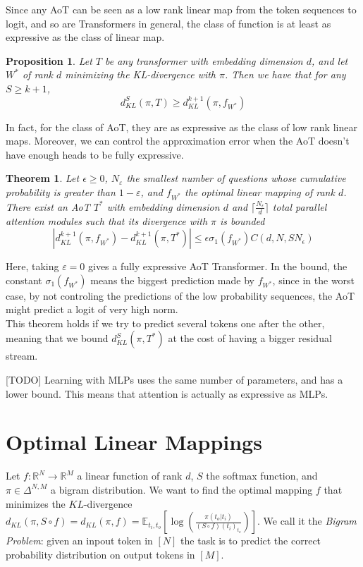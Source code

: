 \documentclass{article}
\newtheorem{theorem}{Theorem}
\newtheorem{prop}{Proposition}
\begin{document}
Since any AoT can be seen as a low rank linear map from the token sequences to logit, and so are Transformers in general, 
the class of function is at least as expressive as the class of linear map.
\bigbreak
\begin{prop}
    Let $T$ be any transformer with embedding dimension $d$, and let $W^*$ of rank $d$ minimizing the KL-divergence with $\pi$.
    Then we have that for any $S\geq k+1$, \[d_{KL}^S(\pi, T) \geq d_{KL}^{k+1}(\pi, f_{W^*}) \]
    \bigbreak
\end{prop}

In fact, for the class of AoT, they are as expressive as the class of low rank linear maps. 
Moreover, we can control the approximation error when the AoT doesn't have enough heads to be fully expressive.
\bigbreak
\begin{theorem}
    Let $\epsilon \geq 0$, $N_{\varepsilon}$ the smallest number of questions whose cumulative probability is greater than 
    $1-\varepsilon$, and $f_{W^*}$ the optimal linear mapping of rank $d$. 
    There exist an AoT $T^*$ with embedding dimension $d$ and $\lceil\frac{N_{\epsilon}}{d}\rceil$ total parallel attention modules 
    such that its divergence with $\pi$ is bounded
    \[\left|d_{KL}^{k+1}(\pi, f_{W^*}) - d_{KL}^{k+1}(\pi, T^*)\right| 
    \leq 
    \epsilon\sigma_1(f_{W^*})C(d,N,SN_{\epsilon})\]
    \bigbreak
\end{theorem}
\noindent Here, taking $\varepsilon=0$ gives a fully expressive AoT Transformer. In the bound, the constant $\sigma_1(f_{W^*})$
means the biggest prediction made by $f_{W^*}$, since in the worst case, by not controling the predictions of the low probability 
sequences, the AoT might predict a logit of very high norm.\\
This theorem holds if we try to predict several tokens one after the other, meaning that we bound $d_{KL}^{S}(\pi, T^*)$ at the cost 
of having a bigger residual stream.
\bigbreak

\bigbreak

[TODO] Learning with MLPs uses the same number of parameters, and has a lower bound. This means that attention is actually as expressive as MLPs.
\bigbreak

\section{Optimal Linear Mappings}

Let $f:\mathbb{R}^N \rightarrow \mathbb{R}^M$ a linear function of rank $d$, $S$  the softmax function, and $\pi\in\Delta^{N,M}$ a bigram 
distribution. We want to find the optimal mapping $f$ that minimizes the $KL$-divergence 
$d_{KL}(\pi, S\circ f) = d_{KL}(\pi, f) = \mathbb{E}_{t_i,t_o}\left[\log\left(\frac{\pi(t_o|t_i)}{(S\circ f)(t_i)_{t_o}}\right)\right]$. We call it the 
\textit{Bigram Problem}: given an inpout token in $[N]$ the task is to predict the correct probability distribution on output tokens in $[M]$. 
\bigbreak
\end{document}
